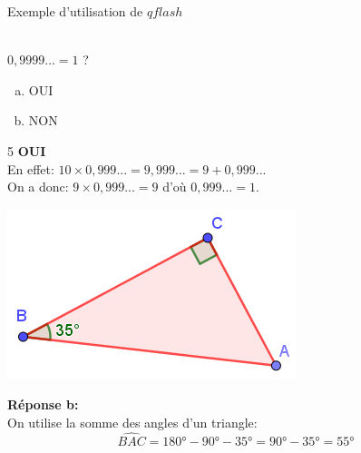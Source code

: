 \documentclass{beamer}
\begin{document}
\begin{quizz}{Exemple d'utilisation de $qflash$}  %

\questionflash
{ %
\\ $0,9999...=1 $ ?
\begin{enumerate}[a.]
\item OUI
\item NON
\end{enumerate}} 
{ %
5 }
{ %
\textbf{OUI}
\\En effet: $10 \times 0,999...=9,999... = 9+0,999...$
\\On a donc: $9 \times 0,999... = 9$ d'où $0,999...=1$.
}
{\begin{center}
\includegraphics[scale=0.6]{figure.png}
\end{center}
\textbf{Réponse b:}
\\On utilise la somme des angles d'un triangle: 
\[ \widehat{BAC} = \ang{180}-\ang{90}-\ang{35}=\ang{90}-\ang{35}=\ang{55}\]
}
\end{quizz}
\end{document}
